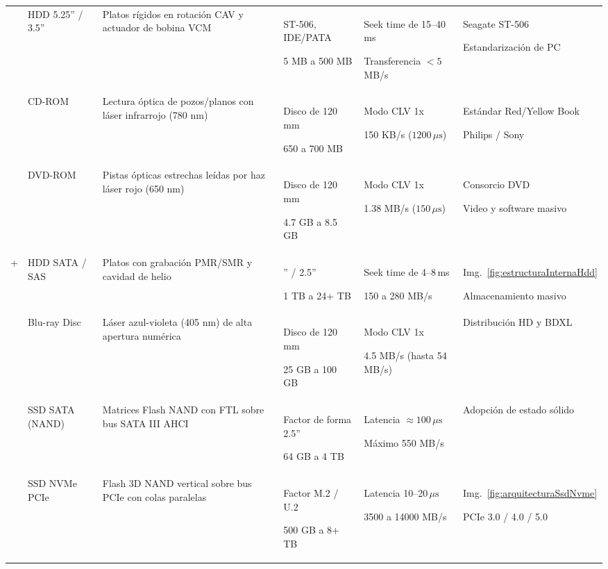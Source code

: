 \documentclass[12pt]{article}
\begin{document}
\begin{table}[htbp]
\begin{tabularx}{\textwidth}{>{\centering\arraybackslash}m{1.2cm} >{\centering\arraybackslash}m{2.2cm} X >{\centering\arraybackslash}m{1.8cm} >{\centering\arraybackslash}m{2.0cm} >{\centering\arraybackslash}m{2.2cm}}
\addlinespace
1980 & HDD 5.25'' / 3.5'' & Platos rígidos en rotación CAV y actuador de bobina VCM & ST-506, IDE/PATA \par 5 MB a 500 MB & Seek time de 15--40\,ms \par Transferencia $< 5$ MB/s & Seagate ST-506 \par Estandarización de PC \\
\addlinespace
1982 & CD-ROM & Lectura óptica de pozos/planos con láser infrarrojo (780 nm) & Disco de 120 mm \par 650 a 700 MB & Modo CLV 1x \par 150 KB/s ($1200\,\mu\text{s}$) & Estándar Red/Yellow Book \par Philips / Sony \\
\addlinespace
1995 & DVD-ROM & Pistas ópticas estrechas leídas por haz láser rojo (650 nm) & Disco de 120 mm \par 4.7 GB a 8.5 GB & Modo CLV 1x \par 1.38 MB/s ($150\,\mu\text{s}$) & Consorcio DVD \par Video y software masivo \\
\addlinespace
2000+ & HDD SATA / SAS & Platos con grabación PMR/SMR y cavidad de helio & 3.5'' / 2.5'' \par 1 TB a 24+ TB & Seek time de 4--8\,ms \par 150 a 280 MB/s & Img.~\ref{fig:estructuraInternaHdd} \par Almacenamiento masivo \\
\addlinespace
2006 & Blu-ray Disc & Láser azul-violeta (405 nm) de alta apertura numérica & Disco de 120 mm \par 25 GB a 100 GB & Modo CLV 1x \par 4.5 MB/s (hasta 54 MB/s) & Distribución HD y BDXL \\
\addlinespace
2008 & SSD SATA (NAND) & Matrices Flash NAND con FTL sobre bus SATA III AHCI & Factor de forma 2.5'' \par 64 GB a 4 TB & Latencia $\approx 100\,\mu\text{s}$ \par Máximo 550 MB/s & Adopción de estado sólido \\
\addlinespace
2015 & SSD NVMe PCIe & Flash 3D NAND vertical sobre bus PCIe con colas paralelas & Factor M.2 / U.2 \par 500 GB a 8+ TB & Latencia 10--20\,$\mu\text{s}$ \par 3500 a 14000 MB/s & Img.~\ref{fig:arquitecturaSsdNvme} \par PCIe 3.0 / 4.0 / 5.0 \\

\end{tabularx}
\end{table}
\end{document}
